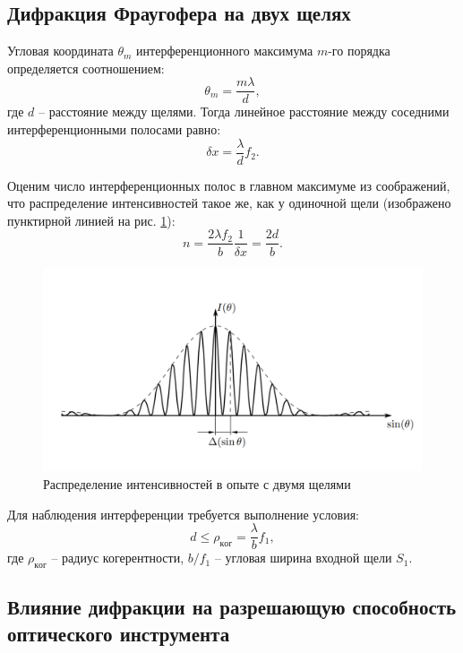 \documentclass[a4paper, 12pt]{article}
\begin{document}
\subsection{Дифракция Фраугофера на двух щелях}

Угловая координата $ \theta_m $ интерференционного максимума $ m $-го порядка определяется соотношением:
\begin{equation*}\label{key}
	\theta_m = \frac{m \lambda}{d},
\end{equation*}
где $ d $ -- расстояние между щелями. Тогда линейное расстояние между соседними интерференционными полосами равно:
\begin{equation}\label{eq:ИнтерфПолосыФраунгоф2}
	\delta x = \frac{\lambda}{d} f_2.
\end{equation}

Оценим число интерференционных полос в главном максимуме из соображений, что распределение интенсивностей такое же, как у одиночной щели (изображено пунктирной линией на рис. \ref{fig:Фраунгофер3}):
\begin{equation}\label{eq:числоЛиний}
	n = \frac{2 \lambda f_2}{b} \frac{1}{\delta x} = \frac{2 d}{b}.
\end{equation}

\begin{figure}[h!]
	\centering
	\includegraphics[width=0.8\linewidth]{5.png}
	\caption{Распределение интенсивностей в опыте с двумя щелями}
	\label{fig:Фраунгофер3}
\end{figure}


Для наблюдения интерференции требуется выполнение условия:
\begin{equation*}\label{eq:условиесрадиусом}
	d\le \rho_{ког} = \frac{\lambda}{b} f_1,
\end{equation*}
где $ \rho_{ког} $ -- радиус когерентности, $ b / f_1 $ -- угловая ширина входной щели $ S_1 $.

\subsection{Влияние дифракции на разрешающую способность оптического инструмента}
\end{document}
